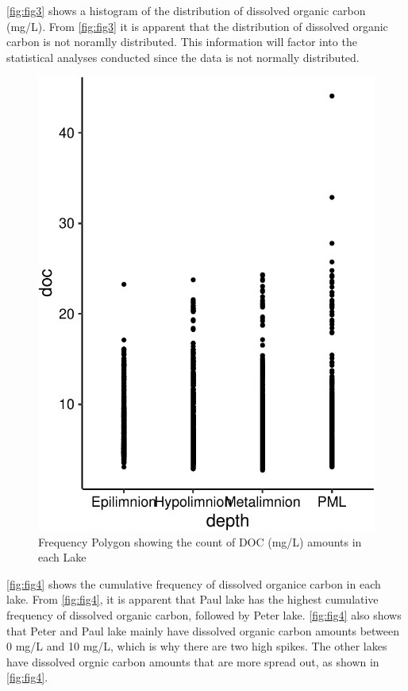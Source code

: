 \documentclass[12pt,]{article}
\begin{document}
\autoref{fig:fig3} shows a histogram of the distribution of dissolved
organic carbon (mg/L). From \autoref{fig:fig3} it is apparent that the
distribution of dissolved organic carbon is not noramlly distributed.
This information will factor into the statistical analyses conducted
since the data is not normally distributed.

\begin{figure}
\centering
\includegraphics{Watson_ENV872_Project_files/figure-latex/unnamed-chunk-8-1.pdf}
\caption{\label{fig:fig4}Frequency Polygon showing the count of DOC
(mg/L) amounts in each Lake}
\end{figure}

\autoref{fig:fig4} shows the cumulative frequency of dissolved organice
carbon in each lake. From \autoref{fig:fig4}, it is apparent that Paul
lake has the highest cumulative frequency of dissolved organic carbon,
followed by Peter lake. \autoref{fig:fig4} also shows that Peter and
Paul lake mainly have dissolved organic carbon amounts between 0 mg/L
and 10 mg/L, which is why there are two high spikes. The other lakes
have dissolved orgnic carbon amounts that are more spread out, as shown
in \autoref{fig:fig4}.
\end{document}
